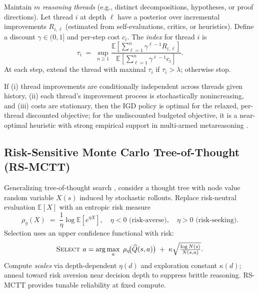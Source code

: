 \documentclass[11pt]{article}
\newcommand{\E}{\mathbb{E}}
\newcommand{\1}{\mathbb{I}}
\begin{document}
Maintain $m$ \emph{reasoning threads} (e.g., distinct decompositions, hypotheses, or proof directions). Let thread $i$ at depth $\ell$ have a posterior over incremental improvements $R_{i,\ell}$ (estimated from self-evaluations, critics, or heuristics). Define a discount $\gamma \in (0,1]$ and per-step cost $c_i$.
The \emph{index} for thread $i$ is
\begin{equation}
\tau_i \;=\; \sup_{n \ge 1} \frac{\E\!\left[ \sum_{\ell=1}^n \gamma^{\ell-1} R_{i,\ell} \right]}{\E\!\left[ \sum_{\ell=1}^n \gamma^{\ell-1} c_i \right]}.
\label{eq:gittins}
\end{equation}
At each step, extend the thread with maximal $\tau_i$ if $\tau_i > \lambda$; otherwise stop. 

\begin{proposition}
If (i) thread improvements are conditionally independent across threads given history, (ii) each thread's improvement process is stochastically nonincreasing, and (iii) costs are stationary, then the IGD policy is optimal for the relaxed, per-thread discounted objective; for the undiscounted budgeted objective, it is a near-optimal heuristic with strong empirical support in multi-armed metareasoning \cite{russellwefald1991,liedergriffiths2020}.
\end{proposition}

\subsection{Risk-Sensitive Monte Carlo Tree-of-Thought (RS-MCTT)}

Generalizing tree-of-thought search \cite{yao2023tot}, consider a thought tree with node value random variable $X(s)$ induced by stochastic rollouts. Replace risk-neutral evaluation $\E[X]$ with an entropic risk measure
\begin{equation}
\rho_{\eta}(X) \;=\; \frac{1}{\eta} \log \E[e^{\eta X}],
\quad \eta < 0 \text{ (risk-averse)},\quad \eta>0 \text{ (risk-seeking)}.
\end{equation}
Selection uses an upper confidence functional with risk:
\[
\textsc{Select } a = \arg\max_{a} \; \rho_{\eta}\!\big(\widehat{Q}(s,a)\big) \;+\; \kappa \sqrt{\tfrac{\log N(s)}{N(s,a)}}.
\]
Compute \emph{scales} via depth-dependent $\eta(d)$ and exploration constant $\kappa(d)$; anneal toward risk aversion near decision depth to suppress brittle reasoning. RS-MCTT provides tunable reliability at fixed compute.
\end{document}
